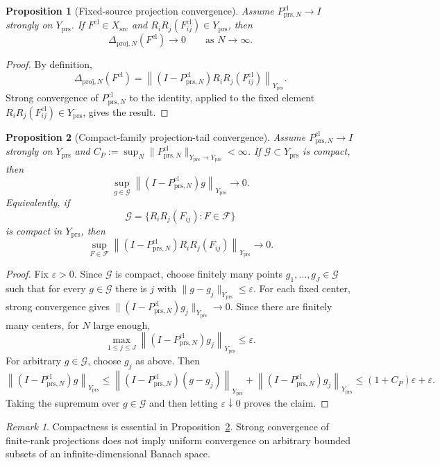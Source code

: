 \documentclass[11pt]{article}
\numberwithin{equation}{section}
\newtheorem{proposition}[proposition]{Proposition}
\theoremstyle{definition}
\theoremstyle{remark}
\newtheorem{remark}[remark]{Remark}
\newcommand{\prs}{\mathrm{prs}}
\newcommand{\proj}{\mathrm{proj}}
\newcommand{\src}{\mathrm{src}}
\newcommand{\cl}{\mathrm{cl}}
\newcommand{\norm}[2]{\left\|#1\right\|_{#2}}
\newcommand{\calF}{\mathcal F}
\newcommand{\calG}{\mathcal G}
\begin{document}
\begin{proposition}[Fixed-source projection convergence]\label{prop:fixed-source-projection}
Assume $P^{\cl}_{\prs,N}\to I$ strongly on $Y_{\prs}$.  If $F^{\cl}\in X_{\src}$ and
$R_iR_j(F^{\cl}_{ij})\in Y_{\prs}$, then
\[
        \Delta_{\proj,N}(F^{\cl})\to0
        \qquad\text{as }N\to\infty.
\]
\end{proposition}

\begin{proof}
By definition,
\[
\Delta_{\proj,N}(F^{\cl})
=
\norm{(I-P^{\cl}_{\prs,N})R_iR_j(F^{\cl}_{ij})}{Y_{\prs}}.
\]
Strong convergence of $P^{\cl}_{\prs,N}$ to the identity, applied to the fixed element
$R_iR_j(F^{\cl}_{ij})\in Y_{\prs}$, gives the result.
\end{proof}

\begin{proposition}[Compact-family projection-tail convergence]\label{prop:compact-family-projection}
Assume $P^{\cl}_{\prs,N}\to I$ strongly on $Y_{\prs}$ and
$C_P:=\sup_N\|P^{\cl}_{\prs,N}\|_{Y_{\prs}\to Y_{\prs}}<\infty$.  If
$\calG\subset Y_{\prs}$ is compact, then
\[
        \sup_{g\in\calG}\norm{(I-P^{\cl}_{\prs,N})g}{Y_{\prs}}
        \to0.
\]
Equivalently, if
\[
        \calG=\{R_iR_j(F_{ij}):F\in\calF\}
\]
is compact in $Y_{\prs}$, then
\[
        \sup_{F\in\calF}
        \norm{(I-P^{\cl}_{\prs,N})R_iR_j(F_{ij})}{Y_{\prs}}
        \to0.
\]
\end{proposition}

\begin{proof}
Fix $\varepsilon>0$.  Since $\calG$ is compact, choose finitely many points
$g_1,\ldots,g_J\in\calG$ such that for every $g\in\calG$ there is $j$ with
$\|g-g_j\|_{Y_{\prs}}\le\varepsilon$.  For each fixed center, strong convergence gives
$\|(I-P^{\cl}_{\prs,N})g_j\|_{Y_{\prs}}\to0$.  Since there are finitely many centers, for
$N$ large enough,
\[
        \max_{1\le j\le J}\norm{(I-P^{\cl}_{\prs,N})g_j}{Y_{\prs}}
        \le\varepsilon.
\]
For arbitrary $g\in\calG$, choose $g_j$ as above.  Then
\[
\norm{(I-P^{\cl}_{\prs,N})g}{Y_{\prs}}
\le
\norm{(I-P^{\cl}_{\prs,N})(g-g_j)}{Y_{\prs}}
+
\norm{(I-P^{\cl}_{\prs,N})g_j}{Y_{\prs}}
\le
(1+C_P)\varepsilon+\varepsilon.
\]
Taking the supremum over $g\in\calG$ and then letting $\varepsilon\downarrow0$ proves the
claim.
\end{proof}

\begin{remark}
Compactness is essential in Proposition~\ref{prop:compact-family-projection}.  Strong convergence of
finite-rank projections does not imply uniform convergence on arbitrary bounded subsets of
an infinite-dimensional Banach space.
\end{remark}
\end{document}
